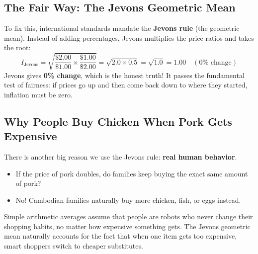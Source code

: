 \documentclass[11pt,a4paper,oneside]{article}
\begin{document}
\subsection{The Fair Way: The Jevons Geometric Mean}
To fix this, international standards mandate the \textbf{Jevons rule} (the geometric mean). Instead of adding percentages, Jevons multiplies the price ratios and takes the root:
\begin{equation}
I_{\text{Jevons}} = \sqrt{\frac{\$2.00}{\$1.00} \times \frac{\$1.00}{\$2.00}} = \sqrt{2.0 \times 0.5} = \sqrt{1.0} = \mathbf{1.00} \quad (0\% \text{ change})
\end{equation}
Jevons gives \textbf{0\% change}, which is the honest truth! It passes the fundamental test of fairness: if prices go up and then come back down to where they started, inflation must be zero.

\subsection{Why People Buy Chicken When Pork Gets Expensive}
There is another big reason we use the Jevons rule: \textbf{real human behavior}.
\begin{itemize}
    \item If the price of pork doubles, do families keep buying the exact same amount of pork?
    \item No! Cambodian families naturally buy more chicken, fish, or eggs instead.
\end{itemize}
Simple arithmetic averages assume that people are robots who never change their shopping habits, no matter how expensive something gets. The Jevons geometric mean naturally accounts for the fact that when one item gets too expensive, smart shoppers switch to cheaper substitutes.
\end{document}
